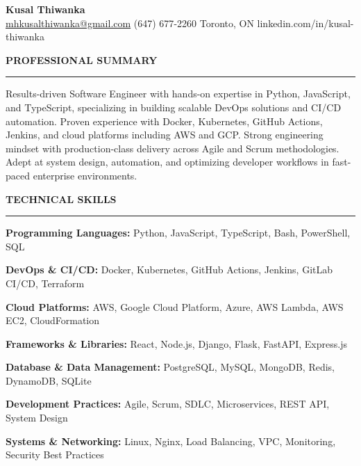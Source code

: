 \documentclass[10pt,letterpaper]{article}
\begin{document}
\begin{center}
{\LARGE\textbf{Kusal Thiwanka}}\\[3pt]
\href{mailto:mhkusalthiwanka@gmail.com}{mhkusalthiwanka@gmail.com}\hspace{2em}%
(647) 677{-}2260\hspace{2em}%
Toronto, ON\hspace{2em}
linkedin.com/in/kusal-thiwanka
\end{center}

\vspace{6pt}

\textbf{PROFESSIONAL SUMMARY}\\[-8pt]
\noindent\rule{\textwidth}{1pt}

\vspace{-2pt}

Results-driven Software Engineer with hands-on expertise in Python, JavaScript, and TypeScript, specializing in building scalable DevOps solutions and CI/CD automation. Proven experience with Docker, Kubernetes, GitHub Actions, Jenkins, and cloud platforms including AWS and GCP. Strong engineering mindset with production-class delivery across Agile and Scrum methodologies. Adept at system design, automation, and optimizing developer workflows in fast-paced enterprise environments.

\vspace{8pt}

\textbf{TECHNICAL SKILLS}\\[-8pt]
\noindent\rule{\textwidth}{1pt}

\vspace{-2pt}

\textbf{Programming Languages:} Python, JavaScript, TypeScript, Bash, PowerShell, SQL

\textbf{DevOps \& CI/CD:} Docker, Kubernetes, GitHub Actions, Jenkins, GitLab CI/CD, Terraform

\textbf{Cloud Platforms:} AWS, Google Cloud Platform, Azure, AWS Lambda, AWS EC2, CloudFormation

\textbf{Frameworks \& Libraries:} React, Node.js, Django, Flask, FastAPI, Express.js

\textbf{Database \& Data Management:} PostgreSQL, MySQL, MongoDB, Redis, DynamoDB, SQLite

\textbf{Development Practices:} Agile, Scrum, SDLC, Microservices, REST API, System Design

\textbf{Systems \& Networking:} Linux, Nginx, Load Balancing, VPC, Monitoring, Security Best Practices
\end{document}
